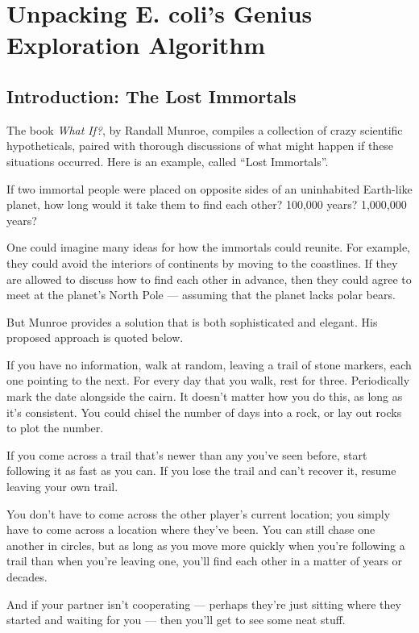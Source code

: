 \chapter[Unpacking E. coli’s Genius Exploration Algorithm]{Unpacking E. coli’s Genius Exploration Algorithm}
\label{chapter:chemotaxis}
\renewcommand{\chaptertitle}{Unpacking E. coli’s Genius Exploration Algorithm}


\FloatBarrier

\section{Introduction: The Lost Immortals}
\label{sec:introduction}

The book \textit{What If?}, by Randall Munroe, compiles a collection of crazy scientific hypotheticals, paired with thorough discussions of what might happen if these situations occurred. Here is an example, called ``Lost Immortals''.

\begin{itquote}
If two immortal people were placed on opposite sides of an uninhabited Earth-like planet, how long would it take them to find each other? 100,000 years? 1,000,000 years?
\end{itquote}

One could imagine many ideas for how the immortals could reunite. For example, they could avoid the interiors of continents by moving to the coastlines. If they are allowed to discuss how to find each other in advance, then they could agree to meet at the planet's North Pole --- assuming that the planet lacks polar bears.

But Munroe provides a solution that is both sophisticated and elegant. His proposed approach is quoted below.

\begin{itquote}
If you have no information, walk at random, leaving a trail of stone markers, each one pointing to the next. For every day that you walk, rest for three. Periodically mark the date alongside the cairn. It doesn’t matter how you do this, as long as it’s consistent. You could chisel the number of days into a rock, or lay out rocks to plot the number.

If you come across a trail that’s newer than any you’ve seen before, start following it as fast as you can. If you lose the trail and can’t recover it, resume leaving your own trail.

You don’t have to come across the other player’s current location; you simply have to come across a location where they’ve been. You can still chase one another in circles, but as long as you move more quickly when you’re following a trail than when you’re leaving one, you’ll find each other in a matter of years or decades.

And if your partner isn’t cooperating --- perhaps they’re just sitting where they started and waiting for you --- then you’ll get to see some neat stuff.
\end{itquote}

